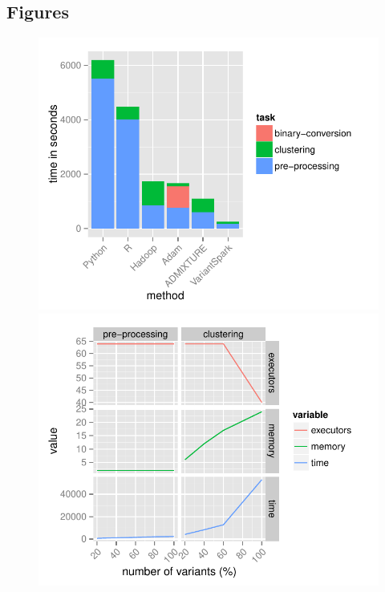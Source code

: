 \documentclass{bmcart}
\begin{document}
\begin{backmatter}



\section*{Figures}
  \begin{figure}[h!]
  \includegraphics[type=pdf,ext=.pdf,read=.pdf, scale=0.45]{images/Resources}
  \includegraphics[type=pdf,ext=.pdf,read=.pdf, scale=0.45]{images/Scaling}

\end{figure}
\end{backmatter}
\end{document}
